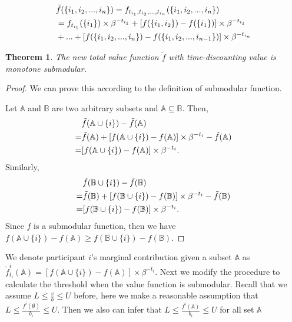 \documentclass[conference,compsocconf,letterpaper,10pt]{IEEEtran}
\newtheorem{theorem}{Theorem}
\begin{document}
\begin{align}
&\tilde{f}(\{i_1,i_2,...,i_n\}) = f_{t_{i_1},t_{i_2},...,t_{i_n}}(\{i_1,i_2,...,i_n\}) \notag \\
&=f_{t_{i_1}}(\{i_1\})\times \beta^{-t_{i_1}} + [f(\{i_1,i_2\})-f(\{i_1\})]\times\beta^{-t_{i_1}} \notag\\
&+... +[f(\{i_1,i_2,...,i_{n}\})-f(\{i_1,i_2,...,i_{n-1}\})]\times\beta^{-t_{i_n}} 
\end{align}

\begin{theorem}
The new total value function $\tilde{f}$ with time-discounting value is monotone submodular.
\end{theorem}
\begin{proof}
We can prove this according to the definition of submodular function.

Let $\mathbb{A}$ and $\mathbb{B}$ are two arbitrary subsets and $\mathbb{A}\subseteq\mathbb{B}$. Then,
\begin{align}
&\tilde{f}(\mathbb{A}\cup\{i\}) - \tilde{f}(\mathbb{A})\notag\\ 
 = &\tilde{f}(\mathbb{A}) + [f(\mathbb{A}\cup\{i\})-f(\mathbb{A})] \times\beta^{-t_i} - \tilde{f}(\mathbb{A}) \notag\\
= &[f(\mathbb{A}\cup\{i\})-f(\mathbb{A})] \times\beta^{-t_i}. \notag
\end{align}
Similarly,
\begin{align}
&\tilde{f}(\mathbb{B}\cup\{i\}) - \tilde{f}(\mathbb{B})  \notag \\
= &\tilde{f}(\mathbb{B}) + [f(\mathbb{B}\cup\{i\})-f(\mathbb{B})] \times\beta^{-t_i} - \tilde{f}(\mathbb{B}) \notag\\
= &[f(\mathbb{B}\cup\{i\})-f(\mathbb{B})] \times\beta^{-t_i}. \notag
\end{align}
Since $f$ is a submodular function, then we have $f(\mathbb{A}\cup\{i\})-f(\mathbb{A})\ge f(\mathbb{B}\cup\{i\})-f(\mathbb{B}) $.
\end{proof}

We denote participant $i$'s marginal contribution given a subset $\mathbb{A}$ as
 $\tilde{f}^i_{t_i}(\mathbb{A}) = [f(\mathbb{A}\cup\{i\}) - f(\mathbb{A})]\times \beta^{-t_i}$.
Next we modify the procedure to calculate the threshold when the value function is submodular. Recall that we assume $L\le\frac{v}{b}\le U$ before, here we make a reasonable assumption that $L\le\frac{f^i(\emptyset)}{b_i}\le U$. Then we also can infer that $L\le\frac{f^i(\mathbb{A})}{b_i}\le U$ for all set $\mathbb{A}$
\end{document}
